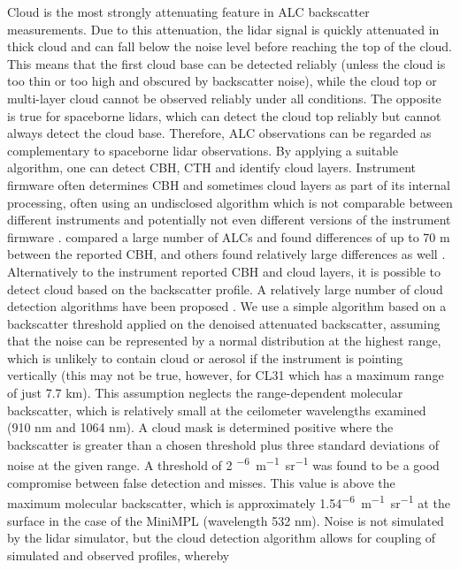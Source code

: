 Cloud is the most strongly attenuating feature in ALC backscatter measurements.
Due to this attenuation, the lidar signal is quickly
attenuated in thick cloud and can fall below the noise level before
reaching the top of the cloud. This means that the first cloud base can be 
detected reliably (unless the cloud is too thin or too high and obscured by backscatter noise), while the cloud top or multi-layer cloud cannot be observed reliably under all conditions. The opposite is true for spaceborne lidars, which can detect the cloud top
reliably but cannot always detect the cloud base. Therefore, ALC observations can be regarded
as complementary to spaceborne lidar observations.
By applying a suitable algorithm, one can detect CBH, CTH and identify cloud layers. Instrument firmware
often determines CBH and sometimes cloud layers as part of its internal
processing, often using an undisclosed algorithm which is not comparable
between different instruments and potentially not even different versions
of the instrument firmware \citep{kotthaus2016}. \cite{mattis2016} compared a large
number of ALCs and found differences of up to 70 m between the reported CBH,
and others found relatively large differences as well \citep{liu2015a,silber2018}.
Alternatively to the instrument reported CBH and cloud layers, it is possible
to detect cloud based on the backscatter profile. A relatively large number of
cloud detection algorithms have been proposed
\citep{wang2001,morille2007,martucci2010,tricht2014,silber2018,cromwell2019}.
We use a simple algorithm based on a backscatter threshold applied
on the denoised attenuated backscatter, assuming that the noise can be
represented by a normal distribution at the highest range, which is unlikely
to contain cloud or aerosol if the instrument is pointing vertically
(this may not be true, however, for CL31 which has a maximum range of just 7.7 km).
This assumption neglects the range-dependent molecular backscatter, which is
relatively small at the ceilometer wavelengths examined (910 nm and 1064 nm).
A cloud mask is determined positive where the backscatter is greater than a
chosen threshold plus three standard deviations of noise at the given range. A threshold of
2 \unit{^{-6}m^{-1}sr^{-1}} was found to be a good compromise between false detection
and misses. This value is above the maximum molecular backscatter,
which is approximately 1.54\unit{^{-6}m^{-1}sr^{-1}} at the
surface in the case of the MiniMPL (wavelength 532 nm).
Noise is not simulated by the lidar simulator, but the cloud detection
algorithm allows for coupling of simulated and observed profiles, whereby
